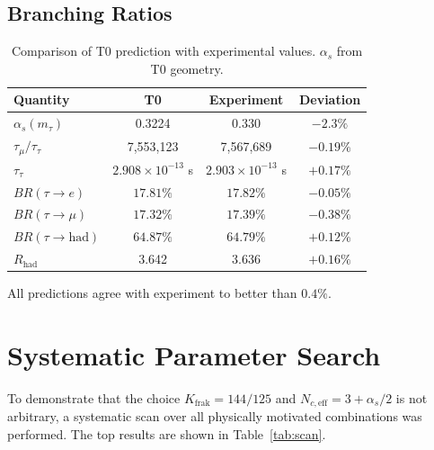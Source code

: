 	\subsection{Branching Ratios}
	
	\begin{table}[h]
		\centering
		\begin{tabular}{lccc}
			\toprule
			\textbf{Quantity} & \textbf{T0} & \textbf{Experiment} & \textbf{Deviation} \\
			\midrule
			$\alpha_s(m_\tau)$ & 0.3224 & 0.330 & $-2.3\%$ \\
			$\tau_\mu/\tau_\tau$ & 7,553,123 & 7,567,689 & $-0.19\%$ \\
			$\tau_\tau$ & $2.908 \times 10^{-13}$ s & $2.903 \times 10^{-13}$ s & $+0.17\%$ \\
			$BR(\tau \to e)$ & $17.81\%$ & $17.82\%$ & $-0.05\%$ \\
			$BR(\tau \to \mu)$ & $17.32\%$ & $17.39\%$ & $-0.38\%$ \\
			$BR(\tau \to \text{had})$ & $64.87\%$ & $64.79\%$ & $+0.12\%$ \\
			$R_\text{had}$ & 3.642 & 3.636 & $+0.16\%$ \\
			\bottomrule
		\end{tabular}
		\caption{Comparison of T0 prediction with experimental values. $\alpha_s$ from T0 geometry.}
		\label{tab:results}
	\end{table}
	
	All predictions agree with experiment to better than $0.4\%$.
	
	
	\section{Systematic Parameter Search}
	
	To demonstrate that the choice $K_\text{frak} = 144/125$ and $N_{c,\text{eff}} = 3 + \alpha_s/2$ is not arbitrary, a systematic scan over all physically motivated combinations was performed. The top results are shown in Table~\ref{tab:scan}.
	

